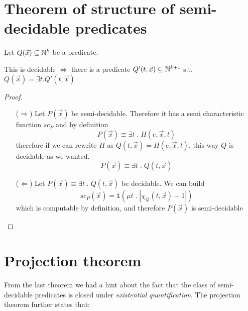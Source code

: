 \section {Theorem of structure of semi-decidable predicates}

\begin{theorem}\label{th:structure}
  Let $ Q(\vec{x}) \subseteq \mathbb{N}^k $ be a predicate.

  This is decidable $ \Leftrightarrow $ there is a predicate $
  Q'(t,\vec{x}) \subseteq \mathbb{N}^{k+1} $ s.t. $ Q(\vec{x}) = \exists
  t. Q'(t,\vec{x}) $
  \begin{proof}
    \begin{itemize}
    \item[($\Rightarrow$)] Let $P(\vec{x})$ be
      semi-decidable. Therefore it has a semi characteristic function
      $sc_P$ and by definition
      \[
        P(\vec{x}) \equiv \exists t \; . \; H(e,\vec{x}, t)
      \]
      therefore if we can rewrite $H$ as
      $Q(t, \vec{x}) = H(e,\vec{x}, t)$, this way $Q$ is decidable as
      we wanted. \[P(\vec{x}) \equiv \exists t \; . \; Q(t, \vec{x})\]

    \item[($\Leftarrow$)] Let
      \(P(\vec{x}) \equiv \exists t \; . \; Q(t, \vec{x})\) be
      decidable. We can build
      \[
        sc_P(\vec{x}) = \mathds{1}(\mu t \; . \; |\chi_Q(t,\vec{x}) - 1|)
      \]
      which is computable by definition, and therefore $P(\vec{x})$ is
      semi-decidable
    \end{itemize}
  \end{proof}
\end{theorem}

\section {Projection theorem}

From the last theorem we had a hint about the fact that the class of
semi-decidable predicates is closed under \emph{existential
  quantification}. The projection theorem further states that:

